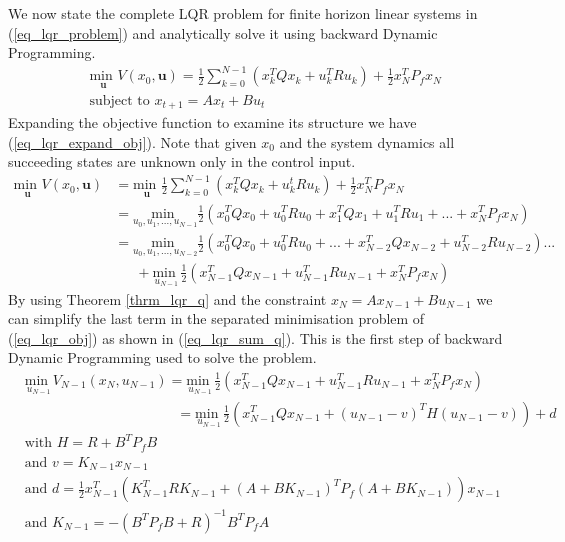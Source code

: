 \documentclass[../masters.tex]{subfiles}
\begin{document}
We now state the complete LQR problem for finite horizon linear systems in (\ref{eq_lqr_problem}) and analytically solve it using backward Dynamic Programming. 
\begin{equation}
\begin{aligned}
&\underset{\mathbf{u}}{\text{min }} V(x_0, \mathbf{u}) = \frac{1}{2}\sum_{k=0}^{N-1} \left( x_k^TQx_k + u_k^TRu_k \right) + \frac{1}{2}x_N^TP_fx_N \\
& \text{subject to } x_{t+1}=Ax_t+Bu_t
\end{aligned}
\label{eq_lqr_problem}
\end{equation}
Expanding the objective function to examine its structure we have (\ref{eq_lqr_expand_obj}). Note that given $x_0$ and the system dynamics all succeeding states are unknown only in the control input.
\begin{equation}
\begin{aligned}
\underset{\mathbf{u}}{\text{min }} V(x_0, \mathbf{u}) &= \underset{\mathbf{u}}{\text{min }} \frac{1}{2}\sum_{k=0}^{N-1} \left( x_k^TQx_k + u_k^tRu_k \right) + \frac{1}{2}x_N^TP_fx_N \\
&= \underset{u_0, u_1,...,u_{N-1}}{\text{min }}  \frac{1}{2}\left( x_0^TQx_0 + u_0^TRu_0 +x_1^TQx_1 + u_1^TRu_1 + ... + x_N^TP_fx_N \right) \\
&= \underset{u_0, u_1,...,u_{N-2}}{\text{min }}  \frac{1}{2}\left( x_0^TQx_0 + u_0^TRu_0 + ... + x_{N-2}^TQx_{N-2} + u_{N-2}^TRu_{N-2} \right)... \\
& \hspace{18pt} + \underset{u_{N-1}}{\text{min }} \frac{1}{2} \left(x_{N-1}^TQx_{N-1}+ u_{N-1}^TRu_{N-1} + x_N^TP_fx_N\right)
\end{aligned}
\label{eq_lqr_expand_obj}
\end{equation}
By using Theorem \ref{thrm_lqr_q} and the constraint $x_N=Ax_{N-1}+Bu_{N-1}$ we can simplify the last term in the separated minimisation problem of (\ref{eq_lqr_obj}) as shown in (\ref{eq_lqr_sum_q}). This is the first step of backward Dynamic Programming used to solve the problem.
\begin{equation}
\begin{aligned}
&\underset{u_{N-1}}{\text{min }}V_{N-1}(x_N, u_{N-1}) =\underset{u_{N-1}}{\text{min }} \frac{1}{2} \left(x_{N-1}^TQx_{N-1}+ u_{N-1}^TRu_{N-1} + x_N^TP_fx_N\right) &\\ 
&\hspace{130pt} = \underset{u_{N-1}}{\text{min }}\frac{1}{2} \left(x_{N-1}^TQx_{N-1} + (u_{N-1}-v)^TH(u_{N-1}-v)\right) + d \\
&\text{with } H = R+B^TP_fB \\
&\text{and } v = K_{N-1}x_{N-1} \\
&\text{and } d = \frac{1}{2}x_{N-1}^T\left(K_{N-1}^TRK_{N-1}+(A+BK_{N-1})^TP_f(A+BK_{N-1})  \right)x_{N-1}\\
&\text{and } K_{N-1} = -(B^TP_fB+R)^{-1}B^TP_fA
\end{aligned}
\label{eq_lqr_sum_q}
\end{equation}
\end{document}
